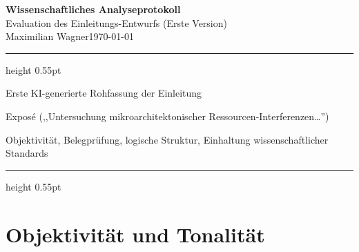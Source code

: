 \documentclass[
  11pt,
  a4paper,
  parskip=half         %
]{scrartcl}
\begin{document}
\begin{center}
  {\sffamily\LARGE\bfseries\color{accent}
    Wissenschaftliches Analyseprotokoll}\\[0.5em]
  {\sffamily\large\color{muted}
    Evaluation des Einleitungs-Entwurfs (Erste Version)}\\[1.2em]
  {\sffamily\small\color{muted}
    Maximilian Wagner\quad\textperiodcentered\quad\today}
\end{center}

\vspace{0.6em}
\par\begingroup\color{accent!35}\hrule height 0.55pt\endgroup
\vspace{0.8em}

\begin{description}[
  labelwidth=5cm,
  leftmargin=!,
  labelsep=0.6em,
  font=\normalfont\bfseries,
  itemsep=0.25em
]
  \item[Untersuchungsgegenstand] Erste KI-generierte Rohfassung der Einleitung
  \item[Referenzdokument] Exposé (,,Untersuchung mikroarchitektonischer Ressourcen-Interfe\-renzen\ldots'')
  \item[Prüfkriterien] Objektivität, Belegprüfung, logische Struktur, Einhaltung wissenschaftlicher Standards
\end{description}

\par\begingroup\color{accent!35}\hrule height 0.55pt\endgroup

\section{Objektivität und Tonalität}
\end{document}
